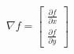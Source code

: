 \documentclass[preview]{standalone}
\begin{document}
\begin{align*}
\nabla f = \begin{bmatrix} \frac{\partial f}{\partial x} \\ \frac{\partial f}{\partial y} \end{bmatrix}
\end{align*}
\end{document}
